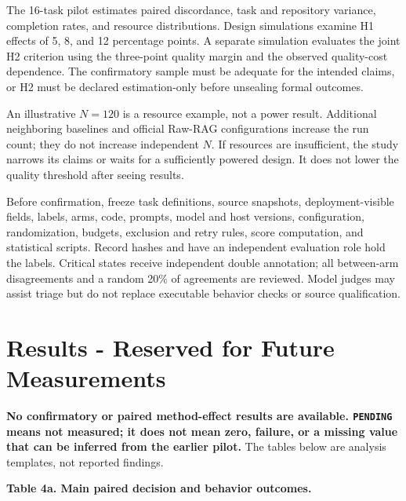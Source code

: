 The 16-task pilot estimates paired discordance, task and repository
variance, completion rates, and resource distributions. Design
simulations examine H1 effects of 5, 8, and 12 percentage points. A
separate simulation evaluates the joint H2 criterion using the
three-point quality margin and the observed quality-cost dependence. The
confirmatory sample must be adequate for the intended claims, or H2 must
be declared estimation-only before unsealing formal outcomes.

An illustrative \(N=120\) is a resource example, not a power result.
Additional neighboring baselines and official Raw-RAG configurations
increase the run count; they do not increase independent \(N\). If
resources are insufficient, the study narrows its claims or waits for a
sufficiently powered design. It does not lower the quality threshold
after seeing results.

Before confirmation, freeze task definitions, source snapshots,
deployment-visible fields, labels, arms, code, prompts, model and host
versions, configuration, randomization, budgets, exclusion and retry
rules, score computation, and statistical scripts. Record hashes and
have an independent evaluation role hold the labels. Critical states
receive independent double annotation; all between-arm disagreements and
a random 20\% of agreements are reviewed. Model judges may assist triage
but do not replace executable behavior checks or source qualification.

\section{Results - Reserved for Future
Measurements}\label{results---reserved-for-future-measurements}

\textbf{No confirmatory or paired method-effect results are available.
\texttt{PENDING} means not measured; it does not mean zero, failure, or
a missing value that can be inferred from the earlier pilot.} The tables
below are analysis templates, not reported findings.


\textbf{Table 4a. Main paired decision and behavior outcomes.}

